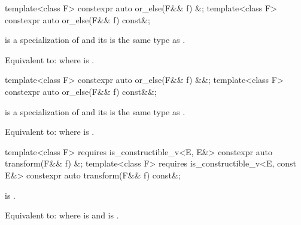 %
\begin{itemdecl}
template<class F> constexpr auto or_else(F&& f) &;
template<class F> constexpr auto or_else(F&& f) const&;
\end{itemdecl}

\begin{itemdescr}
\pnum
\mandates
{} is a specialization of  and its  is the same type as .

\pnum
\effects
Equivalent to:  where  is .
\end{itemdescr}

%
\begin{itemdecl}
template<class F> constexpr auto or_else(F&& f) &&;
template<class F> constexpr auto or_else(F&& f) const&&;
\end{itemdecl}

\begin{itemdescr}
\pnum
\mandates
{} is a specialization of  and its  is the same type as .

\pnum
\effects
Equivalent to:  where  is .
\end{itemdescr}

%
\begin{itemdecl}
template<class F>
  requires is_constructible_v<E, E&>
constexpr auto transform(F&& f) &;
template<class F>
  requires is_constructible_v<E, const E&>
constexpr auto transform(F&& f) const&;
\end{itemdecl}

\begin{itemdescr}
\pnum
\constraints
{} is .

\pnum
\effects
Equivalent to:  where  is  and  is .
\end{itemdescr}

